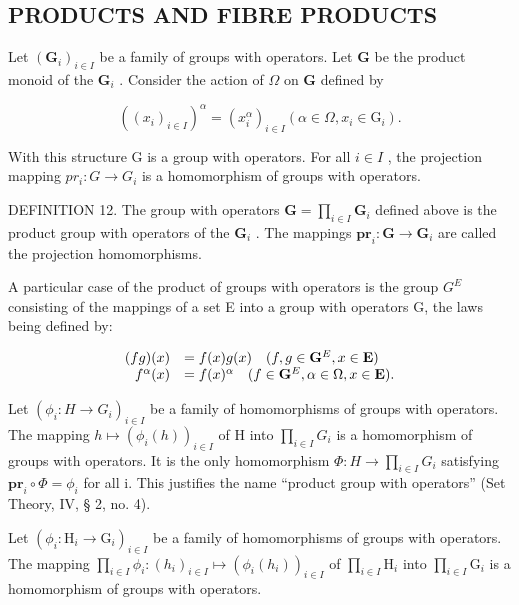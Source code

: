 \subsection{PRODUCTS AND FIBRE PRODUCTS}

Let \((\mathbf{G}_i)_{i\in I}\) be a family of groups with operators. Let \(\mathbf{G}\) be the product monoid of the \(\mathbf{G}_i\) . Consider the action of \(\Omega\) on \(\mathbf{G}\) defined by

\[
((x _ {i}) _ {i \in I}) ^ {\alpha} = (x _ {i} ^ {\alpha}) _ {i \in I} (\alpha \in \Omega , x _ {i} \in \mathrm{G} _ {i}).
\]

With this structure G is a group with operators. For all \(i \in I\) , the projection mapping \(pr_{i}: G \to G_{i}\) is a homomorphism of groups with operators.

DEFINITION 12. The group with operators \(\mathbf{G} = \prod_{i\in I}\mathbf{G}_i\) defined above is the product group with operators of the \(\mathbf{G}_i\) . The mappings \(\mathbf{pr}_i\colon \mathbf{G}\to \mathbf{G}_i\) are called the projection homomorphisms.

A particular case of the product of groups with operators is the group \(G^{E}\) consisting of the mappings of a set E into a group with operators G, the laws being defined by:

\[
\begin{array}{r l} (f g) (x) & = f (x) g (x) \quad (f, g \in \mathbf {G} ^ {E}, x \in \mathbf {E}) \\ f ^ {\alpha} (x) & = f (x) ^ {\alpha} \quad (f \in \mathbf {G} ^ {E}, \alpha \in \Omega , x \in \mathbf {E}). \end{array}
\]

Let \((\phi_{i} \colon H \to G_{i})_{i \in I}\) be a family of homomorphisms of groups with operators. The mapping \(h \mapsto (\phi_{i}(h))_{i \in I}\) of H into \(\prod_{i \in I} G_{i}\) is a homomorphism of groups with operators. It is the only homomorphism \(\Phi \colon H \to \prod_{i \in I} G_{i}\) satisfying \(\mathbf{pr}_{i} \circ \Phi = \phi_{i}\) for all i. This justifies the name ``product group with operators'' (Set Theory, IV, § 2, no. 4).

Let \((\phi_i: \mathrm{H}_i \to \mathrm{G}_i)_{i \in I}\) be a family of homomorphisms of groups with operators. The mapping \(\prod_{i \in I} \phi_i: (h_i)_{i \in I} \mapsto (\phi_i(h_i))_{i \in I}\) of \(\prod_{i \in I} \mathrm{H}_i\) into \(\prod_{i \in I} \mathrm{G}_i\) is a homomorphism of groups with operators.

